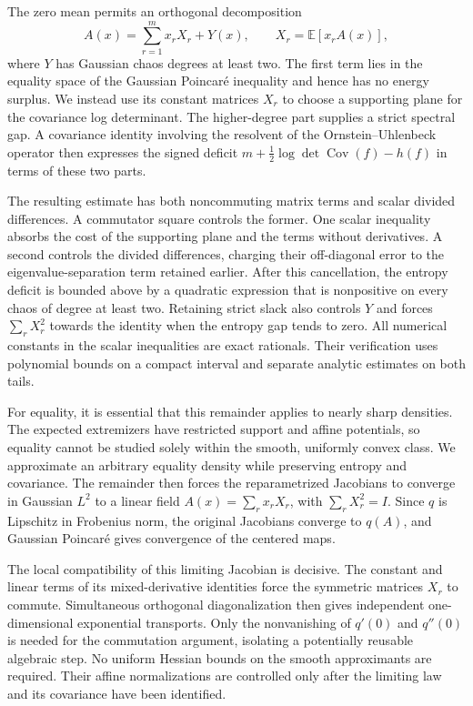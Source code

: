 \documentclass[11pt]{article}
\theoremstyle{definition}
\theoremstyle{remark}
\numberwithin{equation}{section}
\begin{document}
The zero mean permits an orthogonal decomposition
\[
 A(x)=\sum_{r=1}^m x_rX_r+Y(x),
 \qquad X_r=\mathbb E[x_rA(x)],
\]
where $Y$ has Gaussian chaos degrees at least two.  The first term lies
in the equality space of the Gaussian Poincar\'e inequality and hence
has no energy surplus.  We instead use its constant matrices $X_r$ to
choose a supporting plane for the covariance log determinant.
The higher-degree part supplies a strict spectral gap.  A covariance
identity involving the resolvent of the Ornstein--Uhlenbeck operator
then expresses the signed deficit
$m+\tfrac12\log\det\operatorname{Cov}(f)-h(f)$ in terms of these two parts.

The resulting estimate has both noncommuting matrix terms and scalar
divided differences.  A commutator square controls the former.
One scalar inequality absorbs the cost of the supporting plane and
the terms without derivatives.  A second controls the divided
differences, charging their off-diagonal error to the
eigenvalue-separation term retained earlier.
After this cancellation, the entropy deficit is bounded above by a
quadratic expression that is nonpositive on every chaos of degree at
least two. Retaining strict slack also controls $Y$ and forces
$\sum_rX_r^2$ towards the identity when the entropy gap tends to zero.  All numerical constants in the scalar inequalities are
exact rationals.  Their verification uses polynomial bounds on a compact
interval and separate analytic estimates on both tails.

For equality, it is essential that this remainder applies to nearly
sharp densities. The expected extremizers have restricted support and
affine potentials, so equality cannot be studied solely within the
smooth, uniformly convex class. We approximate an arbitrary equality
density while preserving entropy and covariance. The remainder then
forces the reparametrized Jacobians to converge in Gaussian $L^2$ to
a linear field $A(x)=\sum_rx_rX_r$, with $\sum_rX_r^2=I$.
Since $q$ is Lipschitz in Frobenius norm, the original Jacobians
converge to $q(A)$, and Gaussian Poincar\'e gives convergence of the
centered maps.

The local compatibility of this limiting Jacobian is decisive.
The constant and linear terms of its mixed-derivative identities
force the symmetric matrices $X_r$ to commute. Simultaneous
orthogonal diagonalization then gives independent one-dimensional
exponential transports. Only the nonvanishing of $q'(0)$ and $q''(0)$
is needed for the commutation argument, isolating a potentially
reusable algebraic step. No uniform Hessian bounds on the smooth
approximants are required. Their affine normalizations are controlled
only after the limiting law and its covariance have been identified.
\end{document}
